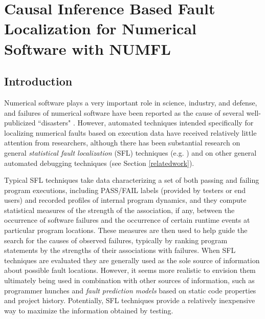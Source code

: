 \chapter{Causal Inference Based Fault Localization for Numerical Software with NUMFL}\label{chap:NUMFL}

\section{Introduction}\label{introduction}
\vspace{-2pt}
Numerical software plays a very important role in science, industry, and defense, and failures of numerical software have been reported as the cause of several well-publicized ``disasters" \cite{VuikWeb,Kanewala2014}.  However, automated techniques intended specifically for localizing numerical faults based on execution data have received relatively little attention from researchers, although there has been substantial research on general {\it statistical fault localization} (SFL) techniques (e.g. \cite{Jones2002,Liblit2004,Liu2005}) and on other general automated debugging techniques (see Section \ref{relatedwork}).

Typical SFL techniques take data characterizing a set of both passing and failing program executions, including PASS/FAIL labels (provided by testers or end users) and recorded profiles of internal program dynamics, and they compute statistical measures of the strength of the association, if any, between the occurrence of software failures and the occurrence of certain runtime events at particular program locations.  These measures are then used to help guide the search for the causes of observed failures, typically by ranking program statements by the strengths of their associations with failures.  When SFL techniques are evaluated they are generally used as the sole source of information about possible fault locations.  However, it seems more realistic to envision them ultimately being used in combination with other sources of information, such as programmer hunches and {\it fault prediction models} \cite{Fenton1999} based on static code properties and project history.  Potentially, SFL techniques provide a relatively inexpensive way to maximize the information obtained by testing.

